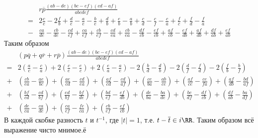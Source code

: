\documentclass[12pt,a4paper]{article}
\begin{document}
\begin{enumproblem}[2.42]
\begin{align*}
        \end{align*}
        \begin{align*}
            &r\overline{p} \frac{(ab - de)(bc - ef)(cd - af)}{abcdef}\\
            =& 2\frac{c}{e} - 2\frac{f}{b} + \frac{d}{e} - \frac{a}{e} - \frac{b}{e} + \frac{d}{b} + \frac{e}{b} - \frac{a}{b} + \frac{c}{d} - \frac{c}{f} - \frac{c}{a} + \frac{f}{c} + \frac{f}{d} - \frac{f}{a}\\
            -& \frac{ca}{de} - \frac{cb}{de} - \frac{cd}{ef} + \frac{ca}{ef} + \frac{cb}{ef} - \frac{cd}{ea} + \frac{cb}{ea}
            - \frac{df}{cb} - \frac{ef}{cb} + \frac{af}{cb} - \frac{ef}{db} + \frac{af}{db} + \frac{df}{ab} + \frac{ef}{ab}
        \end{align*}
        Таким образом
        \begin{align*}
            &(p\overline{q} + q\overline{r} + r\overline{p}) \frac{(ab - de)(bc - ef)(cd - af)}{abcdef}\\
            =& 2\left(\frac{a}{c} - \frac{c}{a}\right) + 2\left(\frac{c}{e} - \frac{e}{c}\right) + 2\left(\frac{e}{a} - \frac{a}{e}\right) - 2\left(\frac{b}{d} - \frac{d}{b}\right) - 2\left(\frac{d}{f} - \frac{f}{d}\right) - 2\left(\frac{f}{b} - \frac{b}{f}\right)\\
            +& \left(\frac{cb}{ea} - \frac{ae}{bc}\right) + \left(\frac{ae}{cd} - \frac{cd}{ea}\right) + \left(\frac{af}{cd} - \frac{cd}{af}\right) + \left(\frac{ce}{ba} - \frac{ab}{ce}\right) + \left(\frac{af}{ce} - \frac{ce}{fa}\right) + \left(\frac{af}{db} - \frac{bd}{af}\right)\\
            +& \left(\frac{bf}{cd} - \frac{cd}{bf}\right) + \left(\frac{ed}{bf} - \frac{bf}{de}\right) + \left(\frac{bd}{ef} - \frac{ef}{db}\right) + \left(\frac{de}{ba} - \frac{ba}{de}\right) + \left(\frac{bc}{df} - \frac{df}{cb}\right) + \left(\frac{df}{ab} - \frac{ba}{df}\right)\\
            +& \left(\frac{de}{ca} - \frac{ca}{de}\right) + \left(\frac{ca}{ef} - \frac{fe}{ca}\right) + \left(\frac{cb}{ef} - \frac{ef}{cb}\right)
        \end{align*}
        В каждой скобке разность $t$ и $t^{-1}$, где $|t| = 1$, т.е. $t - \overline{t} \in i\RR$. Таким образом всё выражение чисто мнимое.ё
    \end{enumproblem}
\end{document}
